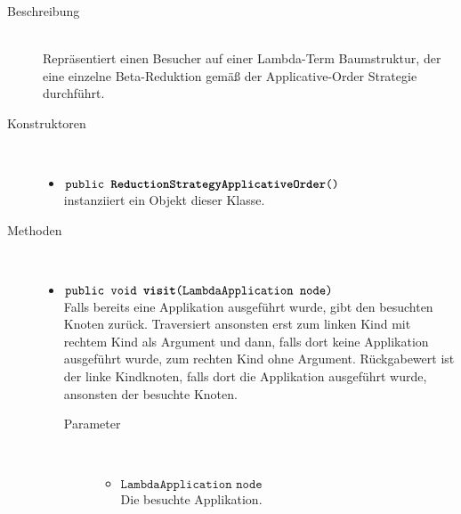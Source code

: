 \begin{description}
\item[Beschreibung] \hfill \\ Repräsentiert einen Besucher auf einer Lambda-Term Baumstruktur, der eine einzelne Beta-Reduktion gemäß der Applicative-Order Strategie durchführt.

\item[Konstruktoren] \hfill \\
	\vspace{-.8cm}
	\begin{itemize}
		\item $\texttt{public \textbf{ReductionStrategyApplicativeOrder}()}$ \\ instanziiert ein Objekt dieser Klasse.
	\end{itemize}

\item[Methoden] \hfill \\
	\vspace{-.8cm}
	\begin{itemize}
		\item $\texttt{public void \textbf{visit}(LambdaApplication node)}$ \\ Falls bereits eine Applikation ausgeführt wurde, gibt den besuchten Knoten zurück. Traversiert ansonsten erst zum linken Kind mit rechtem Kind als Argument und dann, falls dort keine Applikation ausgeführt wurde, zum rechten Kind ohne Argument. Rückgabewert ist der linke Kindknoten, falls dort die Applikation ausgeführt wurde, ansonsten der besuchte Knoten.
		\begin{description}
			\item[Parameter] \hfill \\
			\vspace{-.8cm}
			\begin{itemize}
				\item $\texttt{LambdaApplication node}$ \\ Die besuchte Applikation.
			\end{itemize}
		\end{description}
		

\end{itemize}
\end{description}
